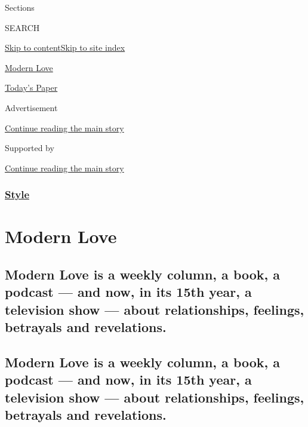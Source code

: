 Sections

SEARCH

\protect\hyperlink{site-content}{Skip to
content}\protect\hyperlink{site-index}{Skip to site index}

\href{https://www.nytimes3xbfgragh.onion/column/modern-love}{Modern
Love}

\href{https://myaccount.nytimes3xbfgragh.onion/auth/login?response_type=cookie\&client_id=vi}{}

\href{https://www.nytimes3xbfgragh.onion/section/todayspaper}{Today's
Paper}

Advertisement

\protect\hyperlink{after-top}{Continue reading the main story}

Supported by

\protect\hyperlink{after-sponsor}{Continue reading the main story}

\hypertarget{style}{%
\subsubsection{\texorpdfstring{\href{/section/style}{Style}}{Style}}\label{style}}

\hypertarget{modern-love}{%
\section{Modern Love}\label{modern-love}}

\hypertarget{modern-love-is-a-weekly-column-a-book-a-podcast--and-now-in-its-15th-year-a-television-show--about-relationships-feelings-betrayals-and-revelations}{%
\subsection{Modern Love is a weekly column, a book, a podcast --- and
now, in its 15th year, a television show --- about relationships,
feelings, betrayals and
revelations.}\label{modern-love-is-a-weekly-column-a-book-a-podcast--and-now-in-its-15th-year-a-television-show--about-relationships-feelings-betrayals-and-revelations}}

\hypertarget{modern-love-is-a-weekly-column-a-book-a-podcast--and-now-in-its-15th-year-a-television-show--about-relationships-feelings-betrayals-and-revelations-1}{%
\subsection{Modern Love is a weekly column, a book, a podcast --- and
now, in its 15th year, a television show --- about relationships,
feelings, betrayals and
revelations.}\label{modern-love-is-a-weekly-column-a-book-a-podcast--and-now-in-its-15th-year-a-television-show--about-relationships-feelings-betrayals-and-revelations-1}}

